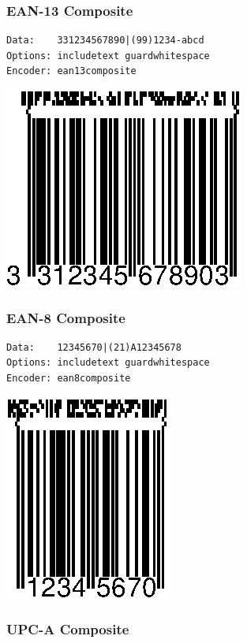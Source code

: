 \hypertarget{ean-13-composite}{%
\subsubsection{EAN-13 Composite}\label{ean-13-composite}}

\begin{verbatim}
Data:    331234567890|(99)1234-abcd
Options: includetext guardwhitespace
Encoder: ean13composite
\end{verbatim}

\includegraphics{images/ean13composite-1.eps}

\hypertarget{ean-8-composite}{%
\subsubsection{EAN-8 Composite}\label{ean-8-composite}}

\begin{verbatim}
Data:    12345670|(21)A12345678
Options: includetext guardwhitespace
Encoder: ean8composite
\end{verbatim}

\includegraphics{images/ean8composite-1.eps}

\hypertarget{upc-a-composite}{%
\subsubsection{UPC-A Composite}\label{upc-a-composite}}


